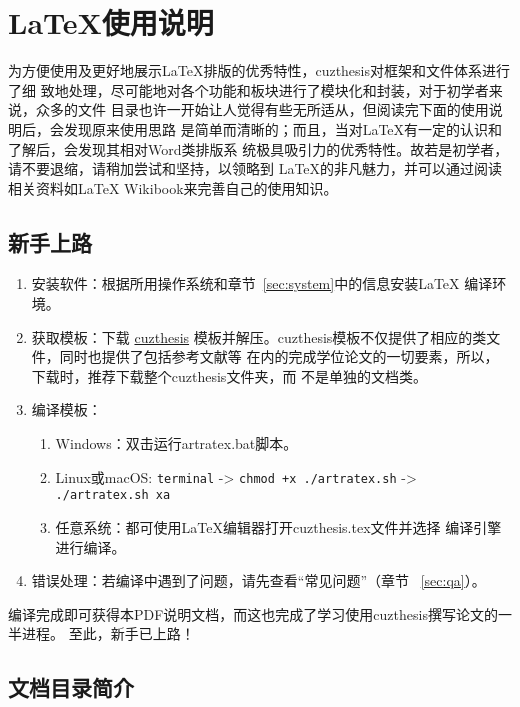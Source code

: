 \chapter{\LaTeX{}使用说明}\label{chap:guide}

为方便使用及更好地展示\LaTeX{}排版的优秀特性，cuzthesis对框架和文件体系进行了细
致地处理，尽可能地对各个功能和板块进行了模块化和封装，对于初学者来说，众多的文件
目录也许一开始让人觉得有些无所适从，但阅读完下面的使用说明后，会发现原来使用思路
是简单而清晰的；而且，当对\LaTeX{}有一定的认识和了解后，会发现其相对Word类排版系
统极具吸引力的优秀特性。故若是初学者，请不要退缩，请稍加尝试和坚持，以领略到
\LaTeX{}的非凡魅力，并可以通过阅读相关资料如\LaTeX{}
Wikibook\citep{wikibook2014latex}来完善自己的使用知识。

\section{新手上路}

\begin{enumerate}
    \item 安装软件：根据所用操作系统和章节~\ref{sec:system}中的信息安装\LaTeX{}
    编译环境。
    \item 获取模板：下载 \href{https://github.com/xiehao/CUZThesis}{cuzthesis}
    模板并解压。cuzthesis模板不仅提供了相应的类文件，同时也提供了包括参考文献等
    在内的完成学位论文的一切要素，所以，下载时，推荐下载整个cuzthesis文件夹，而
    不是单独的文档类。
    \item 编译模板：
        \begin{enumerate}
            \item Windows：双击运行artratex.bat脚本。
            \item Linux或macOS: {\small \verb|terminal| -> \verb|chmod +x ./artratex.sh| -> \verb|./artratex.sh xa|}
            \item 任意系统：都可使用\LaTeX{}编辑器打开cuzthesis.tex文件并选择
            编译引擎进行编译。
        \end{enumerate}
    \item 错误处理：若编译中遇到了问题，请先查看“常见问题”（章节
    ~\ref{sec:qa}）。
\end{enumerate}

编译完成即可获得本PDF说明文档，而这也完成了学习使用cuzthesis撰写论文的一半进程。
至此，新手已上路！

\section{文档目录简介}

